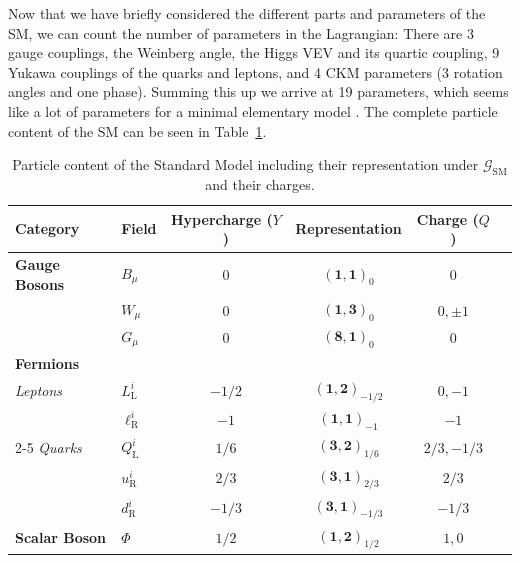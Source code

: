 Now that we have briefly considered the different parts and parameters of the SM, we can count the number of parameters in the Lagrangian: There are 3 gauge couplings, the Weinberg angle, the Higgs VEV and its quartic coupling, 9 Yukawa couplings of the quarks and leptons, and 4 CKM parameters (3 rotation angles and one phase). Summing this up we arrive at 19 parameters, which seems like a lot of parameters for a minimal elementary model \cite{Pernow:2021fvb}. The complete particle content of the SM can be seen in Table~\ref{tab:SMparticle}.

\begin{table}[h]
\centering
\renewcommand{\arraystretch}{1.8} 
\begin{tabular}{llcccc}
\toprule
\textbf{Category} & \textbf{Field} & \textbf{Hypercharge ($Y$)} & \textbf{Representation} & \textbf{Charge ($Q$)} \\
\midrule
\textbf{Gauge Bosons} & $B_\mu$ & 0 & $(\mathbf{1}, \mathbf{1})_0$ & 0 \\
                      & $W_\mu$ & 0 & $(\mathbf{1}, \mathbf{3})_0$ & $0, \pm 1$ \\
                      & $G_\mu$ & 0 & $(\mathbf{8}, \mathbf{1})_0$ & 0 \\
\midrule
\textbf{Fermions}     &  & & & \\
\textit{Leptons}      & $L_{\text{L}}^i$    & $-1/2$ & $(\mathbf{1}, \mathbf{2})_{-1/2}$ & $0, -1$ \\
                      & $\ell_{\text{R}}^i$ & $-1$   & $(\mathbf{1}, \mathbf{1})_{-1}$   & $-1$ \\
\cline{2-5} %
\textit{Quarks}
                      & $Q_{\text{L}}^i$    & $1/6$  & $(\mathbf{3}, \mathbf{2})_{1/6}$  & $2/3, -1/3$ \\
                      & $u_{\text{R}}^i$    & $2/3$  & $(\mathbf{3}, \mathbf{1})_{2/3}$  & $2/3$ \\
                      & $d_{\text{R}}^i$    & $-1/3$ & $(\mathbf{3}, \mathbf{1})_{-1/3}$ & $-1/3$ \\
\midrule
\textbf{Scalar Boson} & $\Phi$ & $1/2$  & $(\mathbf{1}, \mathbf{2})_{1/2}$ & $1, 0$ \\
\bottomrule
\end{tabular}
\caption{Particle content of the Standard Model including their representation under $\mathcal{G}_{\mathrm{SM}}$ and their charges.}
\label{tab:SMparticle}
\end{table}

